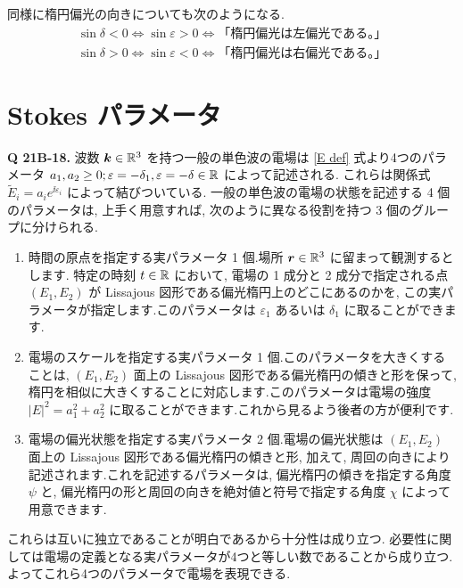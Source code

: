 \documentclass[a4paper,dvipdfmx]{jsarticle}
\theoremstyle{definition}
\begin{document}
同様に楕円偏光の向きについても次のようになる.
\begin{align}
  \sin\delta < 0 \iff \sin\varepsilon > 0 \iff \textrm{「楕円偏光は左偏光である。」} \\
  \sin\delta > 0 \iff \sin\varepsilon < 0 \iff \textrm{「楕円偏光は右偏光である。」}
\end{align}

\section{Stokes パラメータ}
\textbf{Q 21B-18.}
波数 $\vb*{k}\in\mathbb{R}^3$ を持つ一般の単色波の電場は \eqref{E def} 式より4つのパラメータ $a_1, a_2 \geq 0; \varepsilon = -\delta_1, \varepsilon = -\delta\in\mathbb{R}$ によって記述される. これらは関係式 $\tilde{E}_i = a_ie^{\ii \varepsilon_i}$ によって結びついている. 一般の単色波の電場の状態を記述する 4 個のパラメータは, 上手く用意すれば, 次のように異なる役割を持つ 3 個のグループに分けられる.

\begin{enumerate}
  \item 時間の原点を指定する実パラメータ 1 個.場所 $\vb*{r}\in\mathbb{R}^3$ に留まって観測するとします. 特定の時刻 $t\in\mathbb{R}$ において, 電場の 1 成分と 2 成分で指定される点 $(E_1, E_2)$ が Lissajous 図形である偏光楕円上のどこにあるのかを, この実パラメータが指定します.このパラメータは $\varepsilon_1$ あるいは $\delta_1$ に取ることができます.
  \item 電場のスケールを指定する実パラメータ 1 個.このパラメータを大きくすることは, $(E_1, E_2)$ 面上の Lissajous 図形である偏光楕円の傾きと形を保って, 楕円を相似に大きくすることに対応します.このパラメータは電場の強度 $|E|^2 = a_1^2 + a_2^2$ に取ることができます.これから見るよう後者の方が便利です.
  \item 電場の偏光状態を指定する実パラメータ 2 個.電場の偏光状態は $(E_1, E_2)$ 面上の Lissajous 図形である偏光楕円の傾きと形, 加えて, 周回の向きにより記述されます.これを記述するパラメータは, 偏光楕円の傾きを指定する角度 $\psi$ と, 偏光楕円の形と周回の向きを絶対値と符号で指定する角度 $\chi$ によって用意できます.
\end{enumerate}

これらは互いに独立であることが明白であるから十分性は成り立つ. 必要性に関しては電場の定義となる実パラメータが4つと等しい数であることから成り立つ. よってこれら4つのパラメータで電場を表現できる.
\end{document}
